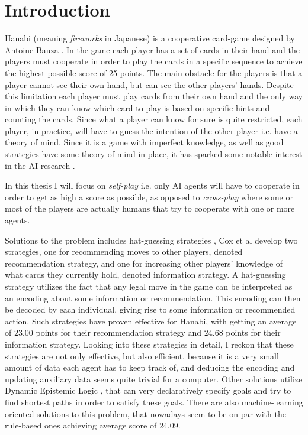\section{Introduction}

Hanabi (meaning \emph{fireworks} in Japanese) is a cooperative card-game designed by Antoine Bauza \cite{BGGHanabi}. 
In the game each player has a set of cards in their hand and the players must cooperate in order to play the cards in a specific sequence to achieve the highest possible score of 25 points.
The main obstacle for the players is that a player cannot see their own hand, but can see the other players' hands. 
Despite this limitation each player must play cards from their own hand and the only way in which they can know which card to play is based on specific hints and counting the cards. 
Since what a player can know for sure is quite restricted, each player, in practice, will have to guess the intention of the other player i.e. have a theory of mind. 
Since it is a game with imperfect knowledge, as well as good strategies have some theory-of-mind in place, it has sparked some notable interest in the AI research \cite{DeepmindAndOthers}. 

In this thesis I will focus on \emph{self-play} i.e. only AI agents will have to cooperate in order to get as high a score as possible, as opposed to \emph{cross-play} where some or most of the players are actually humans that try to cooperate with one or more agents.  

Solutions to the problem includes hat-guessing strategies \cite{CoxEtAl2015}, Cox et al develop two strategies, one for recommending moves to other players, denoted recommendation strategy, and one for increasing other players' knowledge of what cards they currently hold, denoted information strategy. 
A hat-guessing strategy utilizes the fact that any legal move in the game can be interpreted as an encoding about some information or recommendation.
This encoding can then be decoded by each individual, giving rise to some information or recommended action. 
Such strategies have proven effective for Hanabi, with \cite{CoxEtAl2015} getting an average of $23.00$ points for their recommendation strategy and $24.68$ points for their information strategy. 
Looking into these strategies in detail, I reckon that these strategies are not only effective, but also efficient, because it is a very small amount of data each agent has to keep track of, and deducing the encoding and updating auxiliary data seems quite trivial for a computer.
Other solutions utilize Dynamic Epistemic Logic \cite{EgerAndMartens17}, that can very declaratively specify goals and try to find shortest paths in order to satisfy these goals. 
There are also machine-learning oriented solutions to this problem\cite{hu2021otherplay}, that nowadays seem to be on-par with the rule-based ones achieving average score of $24.09$.

